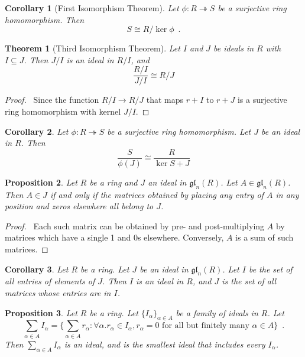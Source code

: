 \documentclass{book}
\let\qed\relax
\newtheorem{prop}{Proposition}[chapter]
\newtheorem{thm}[prop]{Theorem}
\newtheorem{cor}{Corollary}[prop]
\theoremstyle{definition}
\newcommand{\gl}[2]{\ensuremath{\mathfrak{gl}_{#1} \left( {#2} \right)}}
\begin{document}
\begin{cor}[First Isomorphism Theorem]
Let $\phi : R \twoheadrightarrow S$ be a surjective ring homomorphism. Then
\[ S \cong R / \ker \phi \enspace . \]
\end{cor}

\begin{thm}[Third Isomorphism Theorem]
Let $I$ and $J$ be ideals in $R$ with $I \subseteq J$. Then $J/I$ is an ideal in $R/I$, and
\[ \frac{R/I}{J/I} \cong R/J \]
\end{thm}

\begin{proof}
\pf\ Since the function $R/I \rightarrow R/J$ that maps $r + I$ to $r + J$ is a surjective ring homomorphism with kernel $J/I$. \qed
\end{proof}

\begin{cor}
Let $\phi : R \twoheadrightarrow S$ be a surjective ring homomorphism. Let $J$ be an ideal in $R$. Then
\[ \frac{S}{\phi(J)} \cong \frac{R}{\ker S + J} \]
\end{cor}

\begin{prop}
Let $R$ be a ring and $J$ an ideal in $\gl{n}{R}$. Let $A \in \gl{n}{R}$. Then $A \in J$ if and only if the matrices obtained by placing any entry of $A$ in any position and zeros elsewhere all belong to $J$.
\end{prop}

\begin{proof}
\pf\ Each such matrix can be obtained by pre- and post-multiplying $A$ by matrices which have a single 1 and 0s elsewhere. Conversely, $A$ is a sum of such matrices. \qed
\end{proof}

\begin{cor}
\label{cor:ideals-in-glnR}
Let $R$ be a ring. Let $J$ be an ideal in $\gl{n}{R}$. Let $I$ be the set of all entries of elements of $J$. Then $I$ is an ideal in $R$, and $J$ is the set of all matrices whose entries are in $I$.
\end{cor}

\begin{prop}
Let $R$ be a ring. Let $\{I_\alpha\}_{\alpha \in A}$ be a family of ideals in $R$. Let
\[ \sum_{\alpha \in A} I_\alpha = \{ \sum_{\alpha \in A} r_\alpha : \forall \alpha. r_\alpha \in I_\alpha, r_\alpha = 0 \text{ for all but finitely many } \alpha \in A \}\enspace . \]
Then $\sum_{\alpha \in A} I_\alpha$ is an ideal, and is the smallest ideal that includes every $I_\alpha$.
\end{prop}
\end{document}
